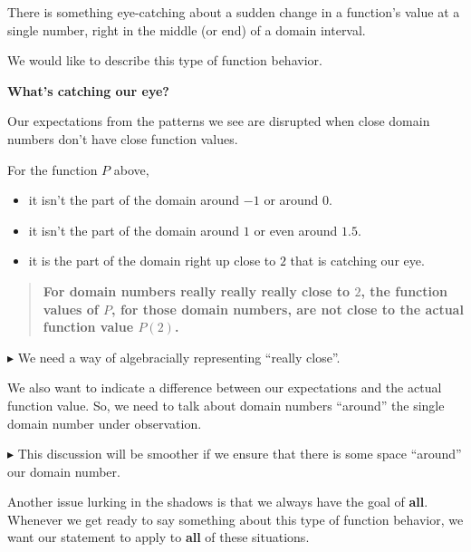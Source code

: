 \documentclass{ximera}
\begin{document}
There is something eye-catching about a sudden change in a function's value at a single number, right in the middle (or end) of a domain interval.

We would like to describe this type of function behavior. 



\begin{observation}  \textbf{\textcolor{-red!75}{What's catching our eye?}}


Our expectations from the patterns we see are disrupted when close domain numbers don't have close function values.


\end{observation}


For the function $P$ above, 

\begin{itemize}
\item it isn't the part of the domain around $-1$ or around $0$.  
\item it isn't the part of the domain around $1$ or even around $1.5$. 
\item it is the part of the domain right up close to $2$ that is catching our eye.
\end{itemize}


\begin{quote}
 \textbf{\textcolor{blue!55!black}{For domain numbers really really really close to $2$, the function values of $P$, for those domain numbers, are not close to the actual function value $P(2)$.}} 
 
\end{quote}







\textbf{\textcolor{red!70!darkgray}{$\blacktriangleright$}} We need a way of algebracially representing ``really close''.  


We also want to indicate a difference between our expectations and the actual function value. So, we need to talk about domain numbers ``around'' the single domain number under observation. 


\textbf{\textcolor{red!70!darkgray}{$\blacktriangleright$}} This discussion will be smoother if we ensure that there is some space ``around'' our domain number. 





Another issue lurking in the shadows is that we always have the goal of \textbf{\textcolor{red!70!black}{all}}. Whenever we get ready to say something about this type of function behavior, we want our statement to apply to \textbf{\textcolor{red!70!black}{all}} of these situations. 
\end{document}
